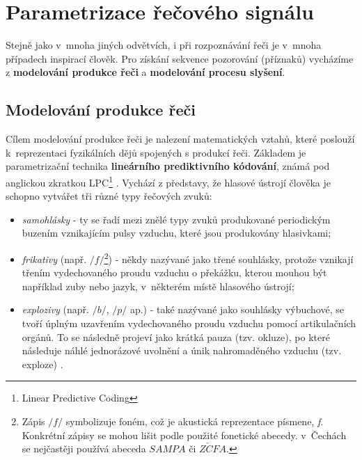 \section{Parametrizace řečového signálu}
\label{chap:asr:parametrization}

Stejně jako v~mnoha jiných odvětvích, i při rozpoznávání řeči je v~mnoha případech inspirací člověk. Pro získání sekvence pozorování (příznaků) vycházíme z \textbf{modelování produkce řeči} a \textbf{modelování procesu slyšení}.

\subsection{Modelování produkce řeči}
\label{chap:asr:parametrization:production}

Cílem modelování produkce řeči je nalezení matematických vztahů, které poslouží k~reprezentaci fyzikálních dějů spojených s produkcí řeči. Základem je parametrizační technika \textbf{lineárního prediktivního kódování}, známá pod anglickou zkratkou LPC\footnote{Linear Predictive Coding} \cite{Benesty2007}. Vychází z představy, že hlasové ústrojí člověka je schopno vytvářet tři různé typy řečových zvuků:

\begin{itemize}
  \item \textit{samohlásky} - ty se řadí mezi znělé typy zvuků produkované periodickým buzením vznikajícím pulsy vzduchu, které jsou produkovány hlasivkami;
  \item \textit{frikativy} (např. $/f/$\footnote{Zápis $/f/$ symbolizuje foném, což je akustická reprezentace písmene, \textit{f}. Konkrétní zápisy se mohou lišit podle použité fonetické abecedy. v~Čechách se nejčastěji používá abeceda $SAMPA$ či $Z\check{C}FA$.}) - někdy nazývané jako třené souhlásky, protože vznikají třením vydechovaného proudu vzduchu o překážku, kterou mouhou být například zuby nebo jazyk, v~některém místě hlasového ústrojí;
  \item \textit{explozivy} (např. $/b/$, $/p/$ ap.) - také nazývané jako souhlásky výbuchové, se tvoří úplným uzavřením vydechovaného proudu vzduchu pomocí artikulačních orgánů. To se následně projeví jako krátká pauza (tzv. okluze), po které následuje náhlé jednorázové uvolnění a únik nahromaděného vzduchu (tzv. exploze) \cite{Psutka2006}.
\end{itemize}

